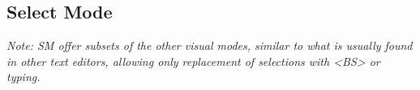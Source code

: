 \subsection*{Select Mode}
\textit{Note: SM offer subsets of the other visual modes, similar to what is usually found in other text editors, allowing only replacement of selections with <BS> or typing.}\\
\\
\\
\\
\\
\\
\ \\
